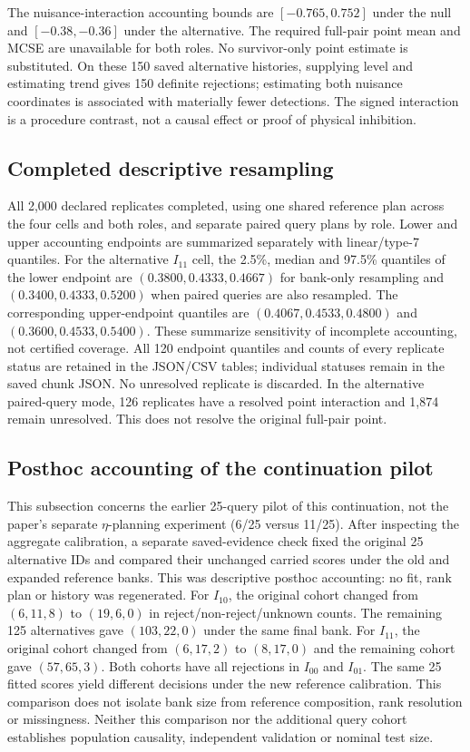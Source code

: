 The nuisance-interaction accounting bounds are $[-0.765,0.752]$ under
the null and $[-0.38,-0.36]$ under the alternative. The required full-pair
point mean and MCSE are unavailable for both roles. No survivor-only point
estimate is substituted. On these 150 saved alternative histories, supplying
level and estimating trend gives 150 definite rejections;
estimating both nuisance coordinates is associated with materially fewer
detections. The signed interaction is a procedure contrast, not a causal
effect or proof of physical inhibition.

\subsection*{Completed descriptive resampling}
All 2,000 declared replicates completed, using one shared reference plan
across the four cells and both roles, and separate paired query plans by
role. Lower and upper accounting endpoints are summarized separately with
linear/type-7 quantiles. For the alternative $I_{11}$ cell, the 2.5\%, median
and 97.5\% quantiles of the lower endpoint are $(0.3800,0.4333,0.4667)$
for bank-only resampling and $(0.3400,0.4333,0.5200)$ when paired queries
are also resampled. The corresponding upper-endpoint quantiles are
$(0.4067,0.4533,0.4800)$ and $(0.3600,0.4533,0.5400)$.
These summarize sensitivity of incomplete accounting, not certified coverage.
All 120 endpoint quantiles and counts of every replicate status are retained
in the JSON/CSV tables; individual statuses remain in the saved chunk JSON.
No unresolved replicate is discarded. In the alternative
paired-query mode, 126 replicates have a resolved point interaction and
1,874 remain unresolved. This does not resolve the original full-pair point.

\subsection*{Posthoc accounting of the continuation pilot}
This subsection concerns the earlier 25-query pilot of this continuation,
not the paper's separate $\eta$-planning experiment (6/25 versus 11/25).
After inspecting the aggregate calibration, a separate saved-evidence check
fixed the original 25 alternative IDs and compared their unchanged carried
scores under the old and expanded reference banks. This was descriptive
posthoc accounting: no fit, rank plan or history was regenerated.
For $I_{10}$, the original cohort changed from $(6,11,8)$ to $(19,6,0)$
in reject/non-reject/unknown counts. The remaining 125 alternatives gave
$(103,22,0)$ under the same final bank. For $I_{11}$, the original cohort
changed from $(6,17,2)$ to $(8,17,0)$ and the remaining cohort gave
$(57,65,3)$. Both cohorts have all rejections in $I_{00}$ and $I_{01}$.
The same 25 fitted scores yield different decisions under the new reference
calibration. This comparison does not isolate bank size from reference
composition, rank resolution or missingness. Neither
this comparison nor the additional query cohort establishes population
causality, independent validation or nominal test size.

